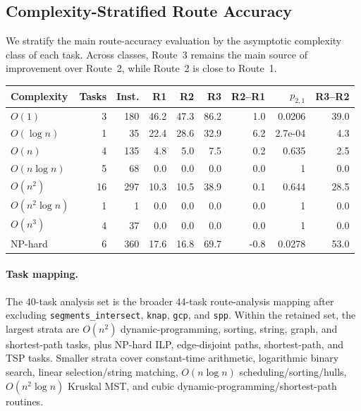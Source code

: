 \subsection{Complexity-Stratified Route Accuracy}
\label{app:complexity_stratified_route_accuracy}

We stratify the main route-accuracy evaluation by the asymptotic complexity
class of each task. Across classes, Route~3 remains the main source of
improvement over Route~2, while Route~2 is close to Route~1.

\begin{center}
\footnotesize
\begin{tabular*}{\textwidth}{@{\extracolsep{\fill}}lrrrrrrrr@{}}
\toprule
Complexity & Tasks & Inst. & R1 & R2 & R3 & R2--R1 & $p_{2,1}$ & R3--R2 \\
\midrule
$O(1)$ & 3 & 180 & 46.2 & 47.3 & 86.2 & 1.0 & 0.0206 & 39.0 \\
$O(\log n)$ & 1 & 35 & 22.4 & 28.6 & 32.9 & 6.2 & 2.7e-04 & 4.3 \\
$O(n)$ & 4 & 135 & 4.8 & 5.0 & 7.5 & 0.2 & 0.635 & 2.5 \\
$O(n \log n)$ & 5 & 68 & 0.0 & 0.0 & 0.0 & 0.0 & 1 & 0.0 \\
$O(n^2)$ & 16 & 297 & 10.3 & 10.5 & 38.9 & 0.1 & 0.644 & 28.5 \\
$O(n^2 \log n)$ & 1 & 1 & 0.0 & 0.0 & 0.0 & 0.0 & 1 & 0.0 \\
$O(n^3)$ & 4 & 37 & 0.0 & 0.0 & 0.0 & 0.0 & 1 & 0.0 \\
NP-hard & 6 & 360 & 17.6 & 16.8 & 69.7 & -0.8 & 0.0278 & 53.0 \\
\bottomrule
\end{tabular*}
\label{tab:appendix_complexity_routes}
\end{center}


\paragraph{Task mapping.}
The 40-task analysis set is the broader 44-task route-analysis mapping after
excluding \texttt{segments\_intersect}, \texttt{knap}, \texttt{gcp}, and
\texttt{spp}. Within the retained set, the largest strata are $O(n^2)$
dynamic-programming, sorting, string, graph, and shortest-path tasks, plus
NP-hard ILP, edge-disjoint paths, shortest-path, and TSP tasks. Smaller strata
cover constant-time arithmetic, logarithmic binary search, linear
selection/string matching,
$O(n \log n)$ scheduling/sorting/hulls, $O(n^2 \log n)$ Kruskal MST, and cubic
dynamic-programming/shortest-path routines.
